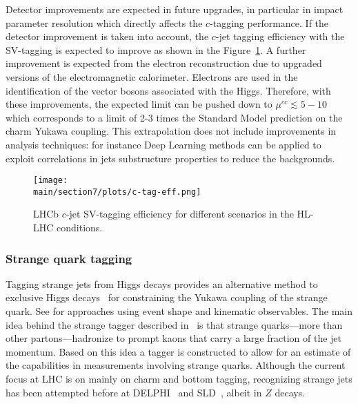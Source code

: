 \documentclass[../report.tex]{subfiles}
\providecommand{\main}{..}
\begin{document}
Detector improvements are expected in future upgrades, in particular in impact parameter resolution which directly affects the $c$-tagging performance. 
If the detector improvement is taken into account, the $c$-jet tagging efficiency with the SV-tagging is expected to  improve as shown in the Figure~\ref{fig:c-tag-eff}.  
A further improvement is expected from the electron reconstruction due to upgraded versions of the electromagnetic calorimeter. Electrons are used in the identification of the vector bosons associated with the Higgs.
Therefore, with these improvements, the expected limit can be pushed down to $\mu^{cc}\lesssim 5-10$ which corresponds to a limit of 2-3 times the Standard Model prediction on the charm Yukawa coupling.
This extrapolation does not include improvements in analysis techniques: for instance  Deep Learning methods can be applied to exploit correlations in  jets substructure properties to reduce the backgrounds.


\begin{figure}[ht]
	\centering
	\texttt{[image: \\main/section7/plots/c-tag-eff.png]}
	\caption{LHCb $c$-jet SV-tagging efficiency for different scenarios in the HL-LHC conditions.}
	\label{fig:c-tag-eff}
\end{figure}

\FloatBarrier

\subsubsection{Strange quark tagging}
\label{sec:strange-tagging}

Tagging strange jets from Higgs decays provides an alternative method to exclusive Higgs decays~\cite{Kagan:2014ila, Perez:2015lra, Koenig:2015pha, Aaboud:2016rug, Aaboud:2017xnb,Alte:2016yuw} for constraining the Yukawa coupling of the strange quark. See  for approaches using event shape and kinematic
observables. The main idea behind the strange tagger described in~ is that
strange quarks---more than other partons---hadronize to prompt kaons that carry a large fraction of the jet momentum. Based on this idea a tagger is constructed to allow for an estimate of the
capabilities in measurements involving strange quarks. Although the current focus at LHC is on
mainly on charm and bottom tagging, recognizing strange jets has been attempted before at
DELPHI~\cite{Boudinov:1998fao} and SLD~\cite{Kalelkar:2000ig}, albeit in $Z$ decays.
\end{document}
